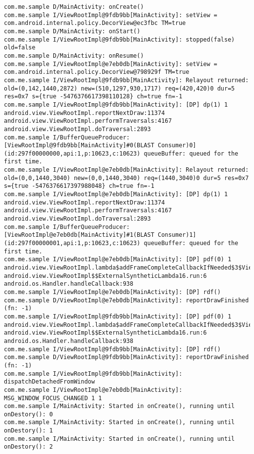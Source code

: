 \documentclass[9pt, b5paper]{article}
\begin{document}
\begin{verbatim}
com.me.sample D/MainActivity: onCreate() 
com.me.sample I/ViewRootImpl@9fdb9bb[MainActivity]: setView = com.android.internal.policy.DecorView@ec3fbc TM=true
com.me.sample D/MainActivity: onStart() 
com.me.sample I/ViewRootImpl@9fdb9bb[MainActivity]: stopped(false) old=false
com.me.sample D/MainActivity: onResume() 
com.me.sample I/ViewRootImpl@e7eb0db[MainActivity]: setView = com.android.internal.policy.DecorView@798929f TM=true
com.me.sample I/ViewRootImpl@9fdb9bb[MainActivity]: Relayout returned: old=(0,142,1440,2872) new=(510,1297,930,1717) req=(420,420)0 dur=5 res=0x7 s={true -5476376617398110128} ch=true fn=-1
com.me.sample I/ViewRootImpl@9fdb9bb[MainActivity]: [DP] dp(1) 1 android.view.ViewRootImpl.reportNextDraw:11374 android.view.ViewRootImpl.performTraversals:4167 android.view.ViewRootImpl.doTraversal:2893 
com.me.sample I/BufferQueueProducer: [ViewRootImpl@9fdb9bb[MainActivity]#0(BLAST Consumer)0](id:297f00000000,api:1,p:10623,c:10623) queueBuffer: queued for the first time.
com.me.sample I/ViewRootImpl@e7eb0db[MainActivity]: Relayout returned: old=(0,0,1440,3040) new=(0,0,1440,3040) req=(1440,3040)0 dur=5 res=0x7 s={true -5476376617397988048} ch=true fn=-1
com.me.sample I/ViewRootImpl@e7eb0db[MainActivity]: [DP] dp(1) 1 android.view.ViewRootImpl.reportNextDraw:11374 android.view.ViewRootImpl.performTraversals:4167 android.view.ViewRootImpl.doTraversal:2893 
com.me.sample I/BufferQueueProducer: [ViewRootImpl@e7eb0db[MainActivity]#1(BLAST Consumer)1](id:297f00000001,api:1,p:10623,c:10623) queueBuffer: queued for the first time.
com.me.sample I/ViewRootImpl@e7eb0db[MainActivity]: [DP] pdf(0) 1 android.view.ViewRootImpl.lambda$addFrameCompleteCallbackIfNeeded$3$ViewRootImpl:4969 android.view.ViewRootImpl$$ExternalSyntheticLambda16.run:6 android.os.Handler.handleCallback:938 
com.me.sample I/ViewRootImpl@e7eb0db[MainActivity]: [DP] rdf()
com.me.sample D/ViewRootImpl@e7eb0db[MainActivity]: reportDrawFinished (fn: -1) 
com.me.sample I/ViewRootImpl@9fdb9bb[MainActivity]: [DP] pdf(0) 1 android.view.ViewRootImpl.lambda$addFrameCompleteCallbackIfNeeded$3$ViewRootImpl:4969 android.view.ViewRootImpl$$ExternalSyntheticLambda16.run:6 android.os.Handler.handleCallback:938 
com.me.sample I/ViewRootImpl@9fdb9bb[MainActivity]: [DP] rdf()
com.me.sample D/ViewRootImpl@9fdb9bb[MainActivity]: reportDrawFinished (fn: -1) 
com.me.sample I/ViewRootImpl@9fdb9bb[MainActivity]: dispatchDetachedFromWindow
com.me.sample I/ViewRootImpl@e7eb0db[MainActivity]: MSG_WINDOW_FOCUS_CHANGED 1 1
com.me.sample I/MainActivity: Started in onCreate(), running until onDestory(): 0
com.me.sample I/MainActivity: Started in onCreate(), running until onDestory(): 1
com.me.sample I/MainActivity: Started in onCreate(), running until onDestory(): 2


\end{verbatim}
\end{document}
